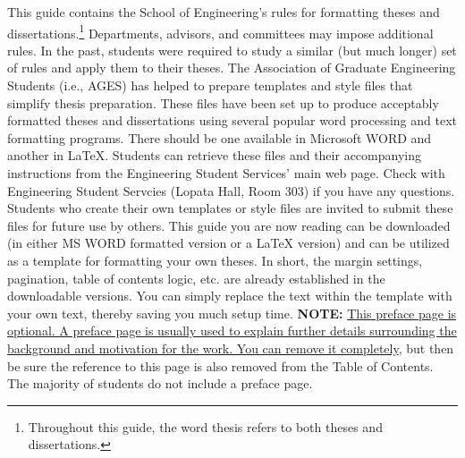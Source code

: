 This guide contains the School of Engineering's rules for formatting theses and
dissertations.\footnote{Throughout this guide, the word thesis refers to both
theses and dissertations.}   Departments, advisors, and committees may impose
additional rules.  In the past, students were required to study a similar (but
much longer) set of rules and apply them to their theses.  The Association of
Graduate Engineering Students (i.e., AGES) has helped to prepare templates and
style files that simplify thesis preparation.  These files have been set up to
produce acceptably formatted theses and dissertations using several popular
word processing and text formatting programs.  There should be one available in
Microsoft WORD and another in \LaTeX{}.  Students can retrieve these files and
their accompanying instructions from the Engineering Student Services' main web
page.  Check with Engineering Student Servcies (Lopata Hall, Room 303) if you
have any questions.  Students who create their own templates or style files are
invited to submit these files for future use by others.  This guide you are
now reading can be downloaded (in either MS WORD formatted version or a \LaTeX{}
version) and can be utilized as a template for formatting your own theses.  In
short, the margin settings, pagination, table of contents logic, etc. are
already established in the downloadable versions.  You can simply replace the
text within the template with your own text, thereby saving you much setup
time.  \textbf{NOTE:} \uline{This preface page is optional.  A preface page
is usually used to explain further details surrounding the background and
motivation for the work.  You can remove it completely}, but then be sure the
reference to this page is also removed from the Table of Contents.  The
majority of students do not include a preface page.




